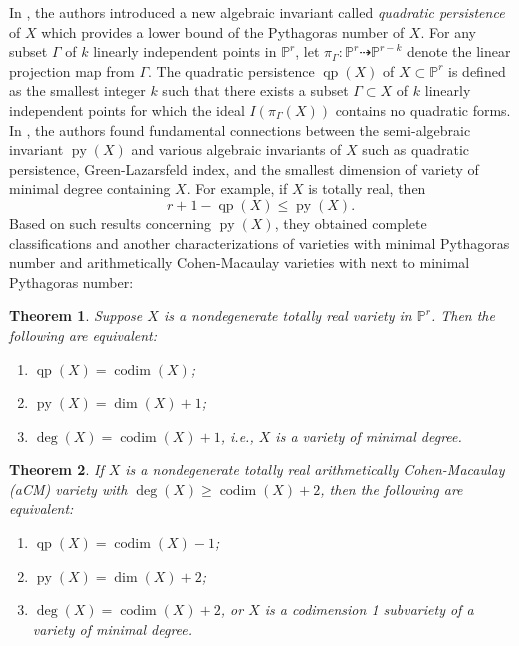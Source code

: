 \documentclass[11pt,letterpaper,reqno]{amsart}
\theoremstyle{plain}
\newtheorem{thmalphabetintro}{Theorem}
\theoremstyle{definition}
\newtheorem{open problem}[theorem]{Open Problem}
\newtheorem{remark and notation}[theorem]{Remark and Notation}
\newtheorem{remark and definition}[theorem]{Remark and Definition}
\newtheorem{definition and notation}[theorem]{Definition and Notation}
\newtheorem{notation and convention}[theorem]{Notation and Convention}
\newtheorem{notation and remark}[theorem]{Notation and Remark}
\newtheorem{convention and notation}[theorem]{Convention and Notation}
\def \p {\mathbb{P}}
\def \codim {\operatorname{codim}}
\def \py {\operatorname{py}}
\def \qp {\operatorname{qp}}
\begin{document}
In \cite{MR4397034}, the authors introduced a new algebraic invariant called \textit{quadratic persistence} of $X$ which provides a lower bound of the Pythagoras number of $X$.
For any subset $\Gamma$ of $k$ linearly independent points in $\p^r$, let $\pi_\Gamma:\p^{r}\dashrightarrow \p^{r-k}$ denote the linear projection map from $\Gamma$.
The quadratic persistence $\qp(X)$ of $X \subset \p^r$ is defined as the smallest integer $k$ such that there exists a subset $\Gamma \subset X$ of $k$ linearly independent points for which the ideal $I({\pi_\Gamma(X)})$ contains no quadratic forms.
In \cite{MR4397034}, the authors found fundamental connections between the semi-algebraic invariant $\py(X)$ and various algebraic invariants of $X$ such as quadratic persistence, Green-Lazarsfeld index, and the smallest dimension of variety of minimal degree containing $X$.
For example, if $X$ is totally real, then
\begin{equation}\label{equ:py,qp}\tag{$\star$}
    r + 1 - \qp(X) \le \py(X).
\end{equation}
Based on such results concerning $\py(X)$, they obtained complete classifications and another characterizations of varieties with minimal Pythagoras number and arithmetically Cohen-Macaulay varieties with next to minimal Pythagoras number:
\begin{thmalphabetintro}\cite[Theorem 1.4]{MR4397034}\label{thm:BSSV1}
Suppose $X$ is a nondegenerate totally real variety in $\p^r$.
    Then the following are equivalent:
    \begin{enumerate}[\rm (i)]
        \item $\qp(X) = \codim(X)$;
        \item $\py(X) = \dim(X) + 1$;
        \item $\deg(X) = \codim(X) + 1$, i.e., $X$ is a variety of minimal degree.
    \end{enumerate}
\end{thmalphabetintro}
\begin{thmalphabetintro}\cite[Theorem 1.5]{MR4397034}\label{thm:BSSV2}
If $X$ is a nondegenerate totally real arithmetically Cohen-Macaulay (aCM) variety with $\deg(X)\geq \codim(X)+2$, then the following are equivalent:
    \begin{enumerate}[\rm (i)]
        \item $\qp(X) = \codim(X) - 1$;
        \item $\py(X) = \dim(X) + 2$;
        \item $\deg(X) = \codim(X) + 2$, or $X$ is a codimension 1 subvariety of a variety of minimal degree.     
    \end{enumerate}
\end{thmalphabetintro}
\end{document}
